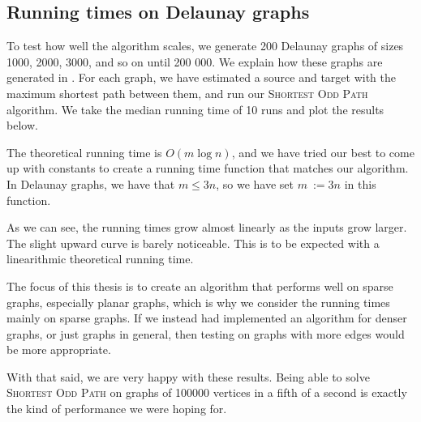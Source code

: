 \subsection{Running times on Delaunay graphs}
\label{subsubsection:odd-path-delaunay-testing}
To test how well the algorithm scales, we generate 200 Delaunay graphs of sizes 1000, 2000, 3000, and so on until 200 000. We explain how these graphs are generated in . For each graph, we have estimated a source and target with the maximum shortest path between them, and run our \textsc{Shortest Odd Path} algorithm. We take the median running time of 10 runs and plot the results below.

The theoretical running time is $O(m \log n)$, and we have tried our best to come up with constants to create a running time function that matches our algorithm. In Delaunay graphs, we have that $m \leq 3n$, so we have set $m~:= 3n$ in this function.

\begin{center}
    
\end{center}

As we can see, the running times grow almost linearly as the inputs grow larger. The slight upward curve is barely noticeable. This is to be expected with a linearithmic theoretical running time.

The focus of this thesis is to create an algorithm that performs well on sparse graphs, especially planar graphs, which is why we consider the running times mainly on sparse graphs. If we instead had implemented an algorithm for denser graphs, or just graphs in general, then testing on graphs with more edges would be more appropriate.

With that said, we are very happy with these results. Being able to solve \textsc{Shortest Odd Path} on graphs of 100000 vertices in a fifth of a second is exactly the kind of performance we were hoping for.
